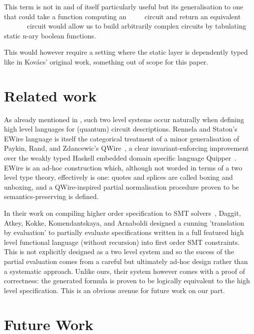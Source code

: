 This term is not in and of itself particularly useful but its
generalisation to one that could take a function computing an
{~~~~} circuit and return an
equivalent {~~\AF{+}~~~~}
circuit would allow us to build arbitrarily complex circuits
by tabulating static n-ary boolean functions.

This would however require a setting where the static layer is
dependently typed like in Kov{\'{a}}cs' original work, something
out of scope for this paper.

\section{Related work}


As already mentioned in , such two level
systems occur naturally when defining high level languages
for (quantum) circuit descriptions.
%
Rennela and Staton's EWire language is itself the categorical
treatment of a minor generalisation of Paykin, Rand,
and Zdancewic's QWire~\cite{DBLP:conf/popl/Paykin0Z17},
a clear invariant-enforcing improvement over the weakly
typed Haskell embedded domain specific language Quipper~\cite{DBLP:conf/rc/GreenLRSV13}.
%
EWire is an ad-hoc construction which, although not worded
in terms of a two level type theory, effectively is one:
quotes and splices are called boxing and unboxing,
and a QWire-inspired partial normalisation procedure
proven to be semantics-preserving is defined.

In their work on compiling higher order specification to SMT
solvers~\cite{DBLP:conf/cpp/DaggittAKKA23},
Daggit, Atkey, Kokke, Komendantskaya, and Arnaboldi
designed a cunning 'translation by evaluation' to
partially evaluate specifications written in a full featured
high level functional language (without recursion)
into first order SMT constraints.
%
This is not explicitly designed as a two level system and
so the sucess of the partial evaluation comes from a careful
but ultimately ad-hoc design rather than a systematic approach.
%
Unlike ours, their system however comes with a proof of
correctness: the generated formula is proven to be logically
equivalent to the high level specification.
%
This is an obvious avenue for future work on our part.


\section{Future Work}

